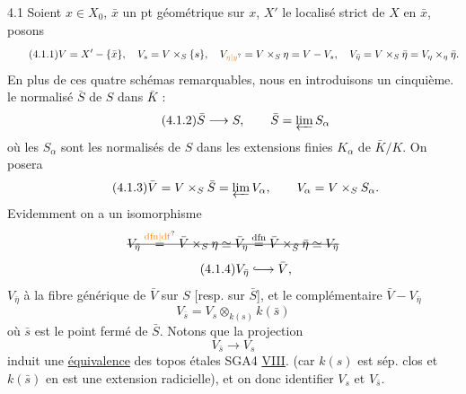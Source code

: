 4.1 Soient  $x\in X_0$, $\bar x$ un pt géométrique sur $x$, $X'$ le localisé strict de $X$ en $\bar x$, posons
\[
\tag*{(4.1.1)}
V=X'-\{\bar x\},\quad V_s=V\times_S\{s\},\quad
V_{\unsure{\eta|y}}=V\times_S\eta=V-V_s,\quad
V_{\bar\eta}=V\times_S\bar\eta=V_\eta\times_\eta\bar\eta.
\]
En plus de ces quatre schémas remarquables, nous en introduisons un cinquième.    le normalisé $\bar S$ de $S$ dans $\bar K$ :
\[
\tag*{(4.1.2)}
\bar S\longrightarrow S,\qquad \bar S=\varprojlim S_\alpha
\]
où les $S_\alpha$ sont les normalisés de $S$ dans les extensions finies  $K_\alpha$ de $\bar K/K$. \deleted{+} On posera
\[
\tag*{(4.1.3)}
\bar V=V\times_S\bar S=\varprojlim V_\alpha,\qquad V_\alpha=V\times_S S_\alpha.
\]
Evidemment on a un isomorphisme
\[
\deleted{V_{\bar\eta}\overset{\unsure{\mathrm{dfn}|\mathrm{df}}}{=}\bar V\times_S\eta
\simeq\bar V_\eta\overset{\mathrm{dfn}}{=}\bar V\times_{\bar S}\bar\eta\simeq V_{\bar\eta}}
\]
\[
\tag*{(4.1.4)}
V_{\bar\eta}\lhook\joinrel\longrightarrow\bar V,
\]
 $V_{\bar\eta}$ à la fibre générique de $\bar V$ sur $S$ [resp. sur $\bar S$], et le complémentaire  $\bar V-V_{\bar\eta}$   
\[
\tag*{(4.1.5).}
V_{\bar s}=V_s\otimes_{k(s)}k(\bar s)
\]
où $\bar s$ est le point fermé de $\bar S$. Notons que la projection
\[
\tag*{(4.1.6)}
V_{\bar s}\longrightarrow V_s
\]
induit une \uline{équivalence} des topos étales  SGA4 \uline{VIII}. (car $k(s)$ est sép. clos et $k(\bar s)$ en est une extension radicielle), et on   donc identifier $V_s$ et $V_{\bar s}$.

